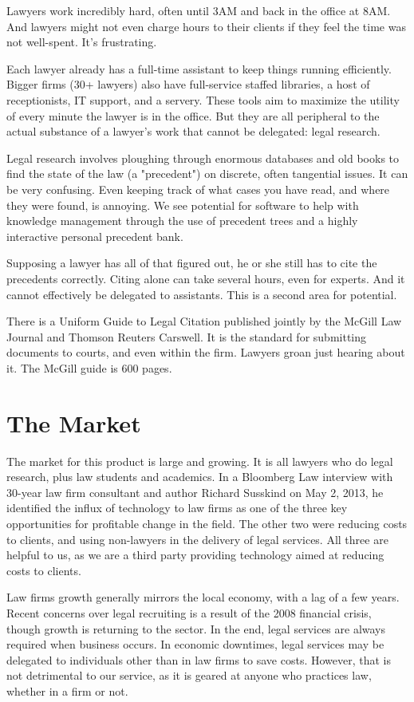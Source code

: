 \documentclass[11pt]{article}
\begin{document}
Lawyers work incredibly hard, often until 3AM and back in the office at 8AM. And lawyers might not even charge hours to their clients if they feel the time was not well-spent. It's frustrating.

Each lawyer already has a full-time assistant to keep things running efficiently. Bigger firms (30+ lawyers) also have full-service staffed libraries, a host of receptionists, IT support, and a servery. These tools aim to maximize the utility of every minute the lawyer is in the office. But they are all peripheral to the actual substance of a lawyer's work that cannot be delegated: legal research. 

Legal research involves ploughing through enormous databases and old books to find the state of the law (a "precedent") on discrete, often tangential issues. It can be very confusing. Even keeping track of what cases you have read, and where they were found, is annoying. We see  potential for software to help with knowledge management through the use of precedent trees and a highly interactive personal precedent bank. 

Supposing a lawyer has all of that figured out, he or she still has to cite the precedents correctly. Citing alone can take several hours, even for experts. And it cannot effectively be delegated to assistants. This is a second area for potential.

There is a Uniform Guide to Legal Citation published jointly by the McGill Law Journal and Thomson Reuters Carswell. It is the standard for submitting documents to courts, and even within the firm. Lawyers groan just hearing about it. The McGill guide is 600 pages.


\section*{The Market}

The market for this product is large and growing. It is all lawyers who do legal research, plus law students and academics. In a Bloomberg Law interview with 30-year law firm consultant and author Richard Susskind on May 2, 2013, he identified the influx of technology to law firms as one of the three key opportunities for profitable change in the field. The other two were reducing costs to clients, and using non-lawyers in the delivery of legal services. All three are helpful to us, as we are a third party providing technology aimed at reducing costs to clients.

Law firms growth generally mirrors the local economy, with a lag of a few years. Recent concerns over legal recruiting is a result of the 2008 financial crisis, though growth is returning to the sector. In the end, legal services are always required when business occurs. In economic downtimes, legal services may be delegated to individuals other than in law firms to save costs. However, that is not detrimental to our service, as it is geared at anyone who practices law, whether in a firm or not.
\end{document}
